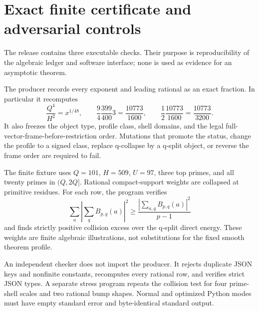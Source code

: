\section{Exact finite certificate and adversarial controls}\label{sec:certificate}

The release contains three executable checks.  Their purpose is reproducibility
of the algebraic ledger and software interface; none is used as evidence for an
asymptotic theorem.

The producer records every exponent and leading rational as an exact fraction.
In particular it recomputes
\[
 \frac{Q^4}{H^2}=x^{1/48},\qquad
 \frac94\frac{399}{400}3=\frac{10773}{1600},\qquad
 \frac12\frac{10773}{1600}=\frac{10773}{3200}.
\]
It also freezes the object type, profile class, shell domains, and the legal
full-vector-frame-before-restriction order.  Mutations that promote the status,
change the profile to a signed class, replace q-collapse by a q-split object, or
reverse the frame order are required to fail.

The finite fixture uses $Q=101$, $H=509$, $U=97$, three top primes, and all
twenty primes in $(Q,2Q]$.  Rational compact-support weights are collapsed at
primitive residues.  For each row, the program verifies
\[
 \sum_a\left|\sum_q B_{p,q}(a)\right|^2
 \geq \frac{\left|\sum_{a,q}B_{p,q}(a)\right|^2}{p-1}
\]
and finds strictly positive collision excess over the q-split direct energy.
These weights are finite algebraic illustrations, not substitutions for the
fixed smooth theorem profile.

An independent checker does not import the producer.  It rejects duplicate JSON
keys and nonfinite constants, recomputes every rational row, and verifies strict
JSON types.  A separate stress program repeats the collision test for four
prime-shell scales and two rational bump shapes.  Normal and optimized Python
modes must have empty standard error and byte-identical standard output.
